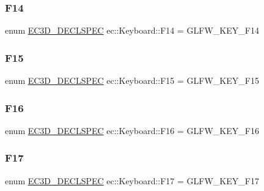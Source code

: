 \subsubsection{\texorpdfstring{F14}{F14}}
{\footnotesize\ttfamily enum \mbox{\hyperlink{_common_8h_aac42573e202ca3dd4d259c81691e2369}{E\+C3\+D\+\_\+\+D\+E\+C\+L\+S\+P\+EC}} ec\+::\+Keyboard\+::\+F14 = G\+L\+F\+W\+\_\+\+K\+E\+Y\+\_\+\+F14}

\mbox{\label{classec_1_1_keyboard_afdf2d1dc1df9357757c30e63a274e331}} 
\subsubsection{\texorpdfstring{F15}{F15}}
{\footnotesize\ttfamily enum \mbox{\hyperlink{_common_8h_aac42573e202ca3dd4d259c81691e2369}{E\+C3\+D\+\_\+\+D\+E\+C\+L\+S\+P\+EC}} ec\+::\+Keyboard\+::\+F15 = G\+L\+F\+W\+\_\+\+K\+E\+Y\+\_\+\+F15}

\mbox{\label{classec_1_1_keyboard_aaf2f8c127d0f27fe1b6c9c13512ccffe}} 
\subsubsection{\texorpdfstring{F16}{F16}}
{\footnotesize\ttfamily enum \mbox{\hyperlink{_common_8h_aac42573e202ca3dd4d259c81691e2369}{E\+C3\+D\+\_\+\+D\+E\+C\+L\+S\+P\+EC}} ec\+::\+Keyboard\+::\+F16 = G\+L\+F\+W\+\_\+\+K\+E\+Y\+\_\+\+F16}

\mbox{\label{classec_1_1_keyboard_a18122e1ed0e95e748ad31caab2ae8708}} 
\subsubsection{\texorpdfstring{F17}{F17}}
{\footnotesize\ttfamily enum \mbox{\hyperlink{_common_8h_aac42573e202ca3dd4d259c81691e2369}{E\+C3\+D\+\_\+\+D\+E\+C\+L\+S\+P\+EC}} ec\+::\+Keyboard\+::\+F17 = G\+L\+F\+W\+\_\+\+K\+E\+Y\+\_\+\+F17}

\mbox{\label{classec_1_1_keyboard_ab3daea4415ff472d2b508d1b253090d2}} 

